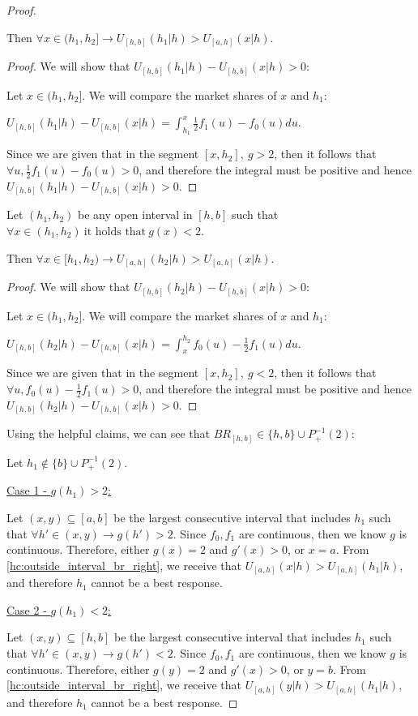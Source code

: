 \begin{proof}
\begin{helpful_claim}
    Then $\forall x \in (h_1, h_2] \to U_{[h,b]}(h_1|h) > U_{[a,h]}(x|h)$.
\end{helpful_claim}
\begin{proof}
    We will show that $U_{[h,b]}(h_1|h) - U_{[h,b]}(x|h) > 0$:
     
    Let  $x \in (h_1, h_2]$.
    We will compare the market shares of $x$ and $h_1$:

     $U_{[h,b]}(h_1|h) - U_{[h,b]}(x|h) = \int_{h_1}^{x} \frac{1}{2}f_1(u) - f_0(u) du$.

    Since we are given that in the segment $[x,h_2], \ g >2$, then it follows that $\forall u, \frac{1}{2}f_1(u) - f_0(u) > 0$, and therefore the integral must be positive and hence $U_{[h,b]}(h_1|h) - U_{[h,b]}(x|h) > 0$.
\end{proof}

\begin{helpful_claim}
\label{hc:inside_interval_br_right}
    Let $(h_1, h_2)$ be any open interval in $[h,b]$ such that $\forall x \in (h_1,h_2) \ \text{it holds that} \ g(x) < 2$.
        
    Then $\forall x \in [h_1, h_2) \to U_{[a,h]}(h_2|h) > U_{[a,h]}(x|h)$.
\end{helpful_claim}
\begin{proof}
    We will show that $U_{[h,b]}(h_2|h) - U_{[h,b]}(x|h) > 0$:
     
    Let  $x \in (h_1, h_2]$.
    We will compare the market shares of $x$ and $h_1$:

     $U_{[h,b]}(h_2|h) - U_{[h,b]}(x|h) = \int_{x}^{h_2} f_0(u)- \frac{1}{2}f_1(u) du$.

    Since we are given that in the segment $[x,h_2], \ g < 2$, then it follows that $\forall u, f_0(u)- \frac{1}{2}f_1(u) > 0$, and therefore the integral must be positive and hence $U_{[h,b]}(h_2|h) - U_{[h,b]}(x|h) > 0$.

\end{proof}
Using the helpful claims, we can see that $BR_{[h,b]} \in \{h,b\} \cup  P_+^{-1}(2)$:

Let $h_1 \notin \{b\} \cup  P_+^{-1}(2)$.

\underline{Case 1 - $g(h_1) > 2$:}

Let $(x,y) \subseteq [a,b]$ be the largest consecutive interval that includes $h_1$ such that $\forall h' \in (x,y) \to g(h') > 2$.
Since $f_0,f_1$ are continuous, then we know $g$ is continuous.
Therefore, either $g(x) = 2$ and $g'(x)>0$, or $x = a$.
From \cref{hc:outside_interval_br_right}, we receive that $U_{[a,h]}(x|h) > U_{[a,h]}(h_1|h)$, and therefore $h_1$ cannot be a best response.

\underline{Case 2 - $g(h_1) < 2$:}

Let $(x,y) \subseteq [h,b]$ be the largest consecutive interval that includes $h_1$ such that $\forall h' \in (x,y) \to g(h') < 2$.
Since $f_0,f_1$ are continuous, then we know $g$ is continuous.
Therefore, either $g(y) = 2$ and $g'(x)>0$, or $y = b$.
From \cref{hc:outside_interval_br_right}, we receive that $U_{[a,h]}(y|h) > U_{[a,h]}(h_1|h)$, and therefore $h_1$ cannot be a best response.

\end{proof}
